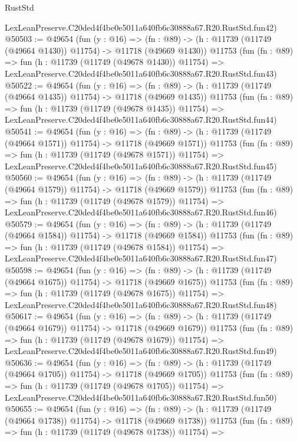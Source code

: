 \begin{lexlean}{RustStd}
\begin{coremodule}
    LexLeanPreserve.C20ded4f4be0e5011a640fb6c30888a67.R20.RustStd.fun42)
@50503 := @49654
    (fun (y : @16) =>
    (fn : @89) -> (h : @11739 (@11749 (@49664 @1430)) @11754) -> @11718 (@49669 @1430))
    @11753
    (fun (fn : @89) =>
    fun (h : @11739 (@11749 (@49678 @1430)) @11754) =>
    LexLeanPreserve.C20ded4f4be0e5011a640fb6c30888a67.R20.RustStd.fun43)
@50522 := @49654
    (fun (y : @16) =>
    (fn : @89) -> (h : @11739 (@11749 (@49664 @1435)) @11754) -> @11718 (@49669 @1435))
    @11753
    (fun (fn : @89) =>
    fun (h : @11739 (@11749 (@49678 @1435)) @11754) =>
    LexLeanPreserve.C20ded4f4be0e5011a640fb6c30888a67.R20.RustStd.fun44)
@50541 := @49654
    (fun (y : @16) =>
    (fn : @89) -> (h : @11739 (@11749 (@49664 @1571)) @11754) -> @11718 (@49669 @1571))
    @11753
    (fun (fn : @89) =>
    fun (h : @11739 (@11749 (@49678 @1571)) @11754) =>
    LexLeanPreserve.C20ded4f4be0e5011a640fb6c30888a67.R20.RustStd.fun45)
@50560 := @49654
    (fun (y : @16) =>
    (fn : @89) -> (h : @11739 (@11749 (@49664 @1579)) @11754) -> @11718 (@49669 @1579))
    @11753
    (fun (fn : @89) =>
    fun (h : @11739 (@11749 (@49678 @1579)) @11754) =>
    LexLeanPreserve.C20ded4f4be0e5011a640fb6c30888a67.R20.RustStd.fun46)
@50579 := @49654
    (fun (y : @16) =>
    (fn : @89) -> (h : @11739 (@11749 (@49664 @1584)) @11754) -> @11718 (@49669 @1584))
    @11753
    (fun (fn : @89) =>
    fun (h : @11739 (@11749 (@49678 @1584)) @11754) =>
    LexLeanPreserve.C20ded4f4be0e5011a640fb6c30888a67.R20.RustStd.fun47)
@50598 := @49654
    (fun (y : @16) =>
    (fn : @89) -> (h : @11739 (@11749 (@49664 @1675)) @11754) -> @11718 (@49669 @1675))
    @11753
    (fun (fn : @89) =>
    fun (h : @11739 (@11749 (@49678 @1675)) @11754) =>
    LexLeanPreserve.C20ded4f4be0e5011a640fb6c30888a67.R20.RustStd.fun48)
@50617 := @49654
    (fun (y : @16) =>
    (fn : @89) -> (h : @11739 (@11749 (@49664 @1679)) @11754) -> @11718 (@49669 @1679))
    @11753
    (fun (fn : @89) =>
    fun (h : @11739 (@11749 (@49678 @1679)) @11754) =>
    LexLeanPreserve.C20ded4f4be0e5011a640fb6c30888a67.R20.RustStd.fun49)
@50636 := @49654
    (fun (y : @16) =>
    (fn : @89) -> (h : @11739 (@11749 (@49664 @1705)) @11754) -> @11718 (@49669 @1705))
    @11753
    (fun (fn : @89) =>
    fun (h : @11739 (@11749 (@49678 @1705)) @11754) =>
    LexLeanPreserve.C20ded4f4be0e5011a640fb6c30888a67.R20.RustStd.fun50)
@50655 := @49654
    (fun (y : @16) =>
    (fn : @89) -> (h : @11739 (@11749 (@49664 @1738)) @11754) -> @11718 (@49669 @1738))
    @11753
    (fun (fn : @89) =>
    fun (h : @11739 (@11749 (@49678 @1738)) @11754) =>

\end{coremodule}
\end{lexlean}
